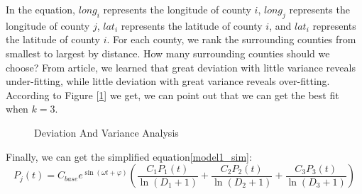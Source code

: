 \documentclass{mcmthesis}
\begin{document}
In the equation, $long_i$ represents the longitude of county $i$, $long_j$ represents the longitude of county $j$, $lat_i$ represents the latitude of county $i$, and $lat_i$ represents the latitude of county $i$. For each county, we rank the surrounding counties from smallest to largest by distance. How many surrounding counties should we choose? From article\cite{5}, we learned that great deviation with little variance reveals under-fitting, while little deviation with great variance reveals over-fitting. According to Figure [\ref{model1_deviation_variance}] we get, we can point out that we can get the best fit when $k = 3$.
\begin{figure}[ht]
	\centering
	\caption{Deviation And Variance Analysis}\label{model1_deviation_variance}	
\end{figure}

Finally, we can get the simplified equation\eqref{model1_sim}:
\begin{equation}
P_{j}(t) = C_{base} e^{\sin (\omega t+\varphi)} \left(\frac{C_1 P_1(t)}{\ln (D_1+1)}+\frac{C_2 P_2(t)}{\ln (D_2+1)}+\frac{C_3 P_3(t)}{\ln (D_3+1)}\right)
\label{model1_sim}
\end{equation}
\end{document}

